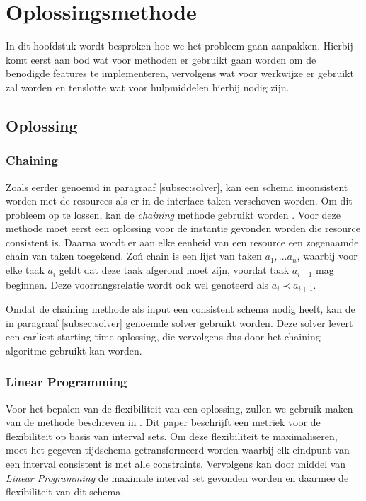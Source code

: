 \section{Oplossingsmethode}
In dit hoofdstuk wordt besproken hoe we het probleem gaan aanpakken. Hierbij komt eerst aan bod wat voor methoden er gebruikt gaan worden om de benodigde features te implementeren, vervolgens wat voor werkwijze er gebruikt zal worden en tenslotte wat voor hulpmiddelen hierbij nodig zijn.

\subsection{Oplossing}


\subsubsection*{Chaining}
Zoals eerder genoemd in paragraaf \ref{subsec:solver}, kan een schema inconsistent worden met de resources als er in de interface taken verschoven worden. Om dit probleem op te lossen, kan de \emph{chaining} methode gebruikt worden \cite{policella2007precedence}. Voor deze methode moet eerst een oplossing voor de instantie gevonden worden die resource consistent is. Daarna wordt er aan elke eenheid van een resource een zogenaamde chain van taken toegekend. Zo\'n chain is een lijst van taken $a_1, \dots a_n$, waarbij voor elke taak $a_i$ geldt dat deze taak afgerond moet zijn, voordat taak $a_{i+1}$ mag beginnen. Deze voorrangsrelatie wordt ook wel genoteerd als $a_i \prec a_{i+1}$.

Omdat de chaining methode als input een consistent schema nodig heeft, kan de in paragraaf \ref{subsec:solver} genoemde solver gebruikt worden. Deze solver levert een earliest starting time oplossing, die vervolgens dus door het chaining algoritme gebruikt kan worden.


\subsubsection*{Linear Programming}
Voor het bepalen van de flexibiliteit van een oplossing, zullen we gebruik maken van de methode beschreven in \cite{wilson2013flexibility}. Dit paper beschrijft een metriek voor de flexibiliteit op basis van interval sets. Om deze flexibiliteit te maximaliseren, moet het gegeven tijdschema getransformeerd worden waarbij elk eindpunt van een interval consistent is met alle constraints. Vervolgens kan door middel van \emph{Linear Programming} de maximale interval set gevonden worden en daarmee de flexibiliteit van dit schema.

